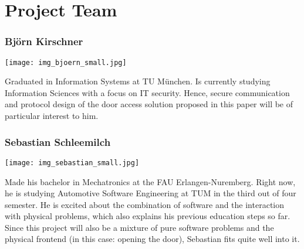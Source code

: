 \section{Project Team}\label{sec:team}

\subsubsection*{Björn Kirschner}
%
\begin{minipage}{0.2\textwidth}
\begin{flushleft}
	\texttt{[image: img\_bjoern\_small.jpg]}
\end{flushleft}
\end{minipage}
\hfill
\begin{minipage}{0.8\textwidth}
%
Graduated in Information Systems at TU München. Is currently studying Information Sciences with a focus on IT security. Hence, secure communication and protocol design of the door access solution proposed in this paper will be of particular interest to him.
%
\end{minipage}


\subsubsection*{Sebastian Schleemilch}
%
\begin{minipage}{0.2\textwidth}
\begin{flushleft}
	\texttt{[image: img\_sebastian\_small.jpg]}
\end{flushleft}
\end{minipage}
\hfill
\begin{minipage}{0.8\textwidth}
%
Made his bachelor in Mechatronics at the FAU Erlangen-Nuremberg. Right now, he is studying Automotive Software Engineering at TUM in the third out of four semester. He is excited about the combination of software and the interaction with physical problems, which also explains his previous education steps so far.
Since this project will also be a mixture of pure software problems and the physical frontend (in this case: opening the door), Sebastian fits quite well into it.
%
\end{minipage}


